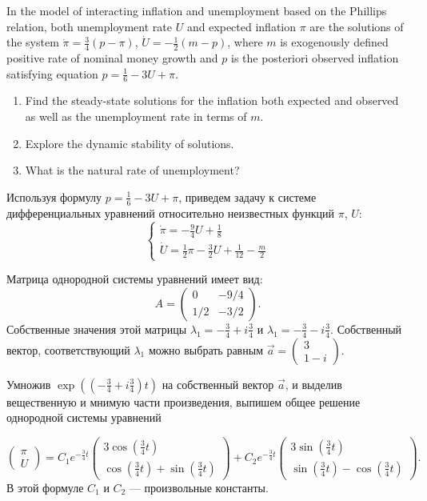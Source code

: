 \begin{problem}
 In the model of interacting inflation and unemployment based on the Phillips relation,  both unemployment rate $U$ and expected inflation $\pi$ are the solutions of the system $\dot{\pi}=\frac{3}{4}(p-\pi)$, $\dot{U}=-\frac{1}{2}(m-p)$, where $m$ is exogenously defined positive rate of nominal money growth and $p$ is the posteriori observed inflation satisfying equation $p=\frac{1}{6}-3U+\pi$.
\begin{enumerate}
\item Find the steady-state solutions for the inflation both expected and observed as well as the unemployment rate in terms of $m$.
\item Explore the dynamic stability of solutions.
\item What is the natural rate of unemployment?
\end{enumerate}



\begin{sol}
Используя формулу $p=\frac{1}{6}-3U+\pi$, приведем задачу к системе дифференциальных уравнений относительно неизвестных функций $\pi$, $U$:
\[
\begin{cases}
\dot{\pi}=-\frac{9}{4}U+\frac{1}{8} \\
\dot{U}=\frac{1}{2}\pi - \frac{3}{2}U+\frac{1}{12}-\frac{m}{2}
\end{cases}
\]

Матрица однородной системы уравнений имеет вид:
\[
A=\begin{pmatrix}
0 & -9/4 \\
1/2 & -3/2
\end{pmatrix}.
\]
Собственные значения этой матрицы  $\lambda_1=-\frac{3}{4}+i\frac{3}{4}$ и  $\lambda_1=-\frac{3}{4}-i\frac{3}{4}$. Собственный вектор, соответствующий $\lambda_1$  можно выбрать  равным
$\vec{a}=\begin{pmatrix}
3 \\
1-i
\end{pmatrix}$.

Умножив  $\exp \left(  \left(- \frac{3}{4} + i \frac{3}{4}  \right)t \right)$ на собственный вектор $\vec{a}$, и выделив вещественную и мнимую части произведения, выпишем общее решение однородной системы уравнений

\[
\begin{pmatrix}
\pi \\
U
\end{pmatrix} =
C_1 e^{-\frac{3}{4}t}
\begin{pmatrix}
3\cos \left( \frac{3}{4}t \right) \\
\cos \left( \frac{3}{4}t \right) + \sin \left( \frac{3}{4}t \right)
\end{pmatrix}
+
C_2 e^{-\frac{3}{4}t}
\begin{pmatrix}
3\sin \left( \frac{3}{4}t \right) \\
\sin \left( \frac{3}{4}t \right) - \cos \left( \frac{3}{4}t \right)
\end{pmatrix}.
\]
В этой формуле $C_1$  и $C_2$  --- произвольные константы.



\end{sol}
\end{problem}

